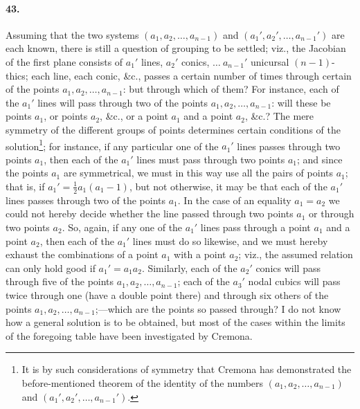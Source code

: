 \documentclass[11pt]{article}
\begin{document}
\paragraph{43.}
Assuming that the two systems $(a_{1},a_{2},\ldots,a_{n-1})$ and
$(a_{1}',a_{2}',\ldots,a_{n-1}')$ are each known, there is still a question
of grouping to be settled; viz., the Jacobian of the first plane consists
of $a_{1}'$ lines, $a_{2}'$ conics, $\ldots\ a_{n-1}'$ unicursal
$(n-1)$-thics; each line, each conic, \&c., passes a certain number of
times through certain of the points $a_{1},a_{2},\ldots,a_{n-1}$: but
through which of them? For instance, each of the $a_{1}'$ lines will pass
through two of the points $a_{1},a_{2},\ldots,a_{n-1}$: will these be
points $a_{1}$, or points $a_{2}$, \&c., or a point $a_{1}$ and a point
$a_{2}$, \&c.? The mere symmetry of the different groups of points
determines certain conditions of the solution\footnote{It is by such
considerations of symmetry that Cremona has demonstrated the
before-mentioned theorem of the identity of the numbers
$(a_{1},a_{2},\ldots,a_{n-1})$ and $(a_{1}',a_{2}',\ldots,a_{n-1}')$.};
for instance, if any particular one of the $a_{1}'$ lines passes through
two points $a_{1}$, then each of the $a_{1}'$ lines must pass through two
points $a_{1}$; and since the points $a_{1}$ are symmetrical, we must in
this way use all the pairs of points $a_{1}$; that is, if
$a_{1}'=\tfrac{1}{2}a_{1}(a_{1}-1)$, but not otherwise, it may be that
each of the $a_{1}'$ lines passes through two of the points $a_{1}$. In
the case of an equality $a_{1}=a_{2}$ we could not hereby decide whether
the line passed through two points $a_{1}$ or through two points $a_{2}$.
So, again, if any one of the $a_{1}'$ lines pass through a point $a_{1}$
and a point $a_{2}$, then each of the $a_{1}'$ lines must do so likewise,
and we must hereby exhaust the combinations of a point $a_{1}$ with a
point $a_{2}$; viz., the assumed relation can only hold good if
$a_{1}'=a_{1}a_{2}$. Similarly, each of the $a_{2}'$ conics will pass
through five of the points $a_{1},a_{2},\ldots,a_{n-1}$; each of the
$a_{3}'$ nodal cubics will pass twice through one (have a double point
there) and through six others of the points
$a_{1},a_{2},\ldots,a_{n-1}$;---which are the points so passed through? I
do not know how a general solution is to be obtained, but most of the
cases within the limits of the foregoing table have been investigated by
Cremona.

\end{document}
